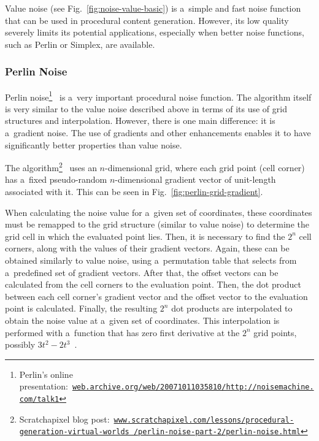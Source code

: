 Value noise (see Fig.~\ref{fig:noise-value-basic}) is a~simple and fast noise function that can be used in procedural content generation. However, its low quality severely limits its potential applications, especially when better noise functions, such as Perlin or Simplex, are available.

\subsubsection*{Perlin Noise}
Perlin noise\footnote{Perlin's online presentation:~\href{https://web.archive.org/web/20071011035810/http://noisemachine.com/talk1/}{\texttt{web.archive.org/web/20071011035810/http://noisemachine.com/talk1}}}~\cite{perlin-image-synthesizer} is a~very important procedural noise function. The algorithm itself is very similar to the value noise described above in terms of its use of grid structures and interpolation. However, there is one main difference: it is a~gradient noise. The use of gradients and other enhancements enables it to have significantly better properties than value noise.

The algorithm\footnote{Scratchapixel blog post:~\href{https://www.scratchapixel.com/lessons/procedural-generation-virtual-worlds/perlin-noise-part-2/perlin-noise.html}{\texttt{www.scratchapixel.com/lessons/procedural-generation-virtual-worlds /perlin-noise-part-2/perlin-noise.html}}}~\cite{gustavson-simplex-noise, perlin-image-synthesizer, scratchapixel} uses an $n$-dimensional grid, where each grid point (cell corner) has a~fixed pseudo-random $n$-dimensional gradient vector of unit-length associated with it. This can be seen in Fig.~\ref{fig:perlin-grid-gradient}. 



When calculating the noise value for a~given set of coordinates, these coordinates must be remapped to the grid structure (similar to value noise) to determine the grid cell in which the evaluated point lies. Then, it is necessary to find the $2^n$ cell corners, along with the values of their gradient vectors. Again, these can be obtained similarly to value noise, using a~permutation table that selects from a~predefined set of gradient vectors. After that, the offset vectors can be calculated from the cell corners to the evaluation point. Then, the dot product between each cell corner's gradient vector and the offset vector to the evaluation point is calculated. Finally, the resulting $2^n$ dot products are interpolated to obtain the noise value at a~given set of coordinates. This interpolation is performed with a~function that has zero first derivative at the $2^n$ grid points, possibly $3t^2 - 2t^3$~\cite{perlin-improving-noise, gustavson-simplex-noise, perlin-image-synthesizer}.


